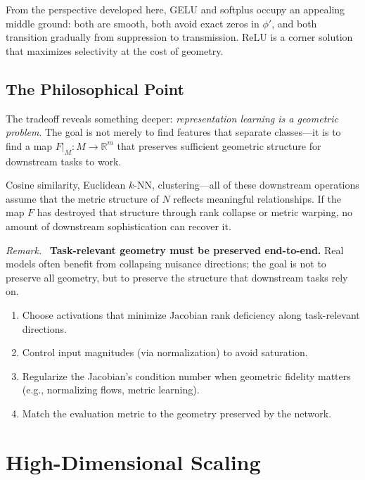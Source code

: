\documentclass[11pt,a4paper]{article}
\theoremstyle{remark}
\newenvironment{designprinciple}{\par\medskip\noindent\textit{Remark.}\ }{\par\medskip}
\begin{document}
From the perspective developed here, GELU and softplus occupy an appealing middle ground: both are smooth, both avoid exact zeros in $\phi'$, and both transition gradually from suppression to transmission.
ReLU is a corner solution that maximizes selectivity at the cost of geometry.

\subsection{The Philosophical Point}

The tradeoff reveals something deeper: \emph{representation learning is a geometric problem}.
The goal is not merely to find features that separate classes---it is to find a map $F|_M: M \to \mathbb{R}^m$ that preserves sufficient geometric structure for downstream tasks to work.

Cosine similarity, Euclidean $k$-NN, clustering---all of these downstream operations assume that the metric structure of $N$ reflects meaningful relationships.
If the map $F$ has destroyed that structure through rank collapse or metric warping, no amount of downstream sophistication can recover it.

\begin{designprinciple}
\textbf{Task-relevant geometry must be preserved end-to-end.}
Real models often benefit from collapsing nuisance directions; the goal is not to preserve all geometry, but to preserve the structure that downstream tasks rely on.
\begin{enumerate}[label=(\alph*)]
  \item Choose activations that minimize Jacobian rank deficiency along task-relevant directions.
  \item Control input magnitudes (via normalization) to avoid saturation.
  \item Regularize the Jacobian's condition number when geometric fidelity matters (e.g., normalizing flows, metric learning).
  \item Match the evaluation metric to the geometry preserved by the network.
\end{enumerate}
\end{designprinciple}


\section{High-Dimensional Scaling}
\label{sec:highdim}
\end{document}
